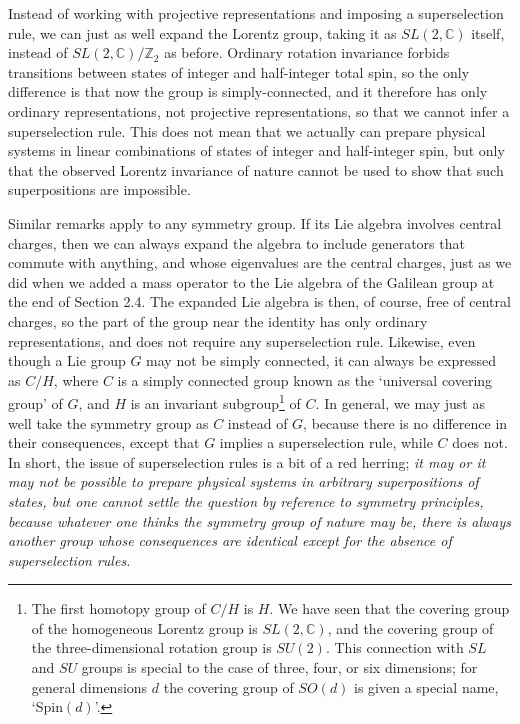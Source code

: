 Instead of working with projective representations and imposing a
superselection rule, we can just as well expand the Lorentz group, taking it as
$SL(2,\mathbb{C})$ itself, instead of $SL(2,\mathbb{C})/\mathbb{Z}_2$ as before. Ordinary rotation
invariance forbids transitions between states of integer and half-integer total
spin, so the only difference is that now the group is simply-connected, and it
therefore has only ordinary representations, not projective representations,
so that we cannot infer a superselection rule. This does not mean that we
actually can prepare physical systems in linear combinations of states of
integer and half-integer spin, but only that the observed Lorentz invariance of
nature cannot be used to show that such superpositions are impossible.

Similar remarks apply to any symmetry group. If its Lie algebra involves
central charges, then we can always expand the algebra to include generators
that commute with anything, and whose eigenvalues are the central charges, just
as we did when we added a mass operator to the Lie algebra of the Galilean group
at the end of Section 2.4. The expanded Lie algebra is then, of course, free of
central charges, so the part of the group near the identity has only ordinary
representations, and does not require any superselection rule. Likewise, even
though a Lie group $G$ may not be simply connected, it can always be expressed
as $C/H$, where $C$ is a simply connected group known as the `universal covering
group' of $G$, and $H$ is an invariant subgroup\footnote{The first homotopy
group of $C/H$ is $H$. We have seen that the covering group of the homogeneous
Lorentz group is $SL(2,\mathbb{C})$, and the covering group of the three-dimensional
rotation group is $SU(2)$. This connection with $SL$ and $SU$ groups is special
to the case of three, four, or six dimensions; for general dimensions $d$ the
covering group of $SO(d)$ is given a special name, `Spin$(d)$'.}
of $C$. In general, we may just as well take the symmetry group as $C$ instead
of $G$, because there is no difference in their consequences, except that $G$
implies a superselection rule, while $C$ does not. In short, the issue of
superselection rules is a bit of a red herring; \emph{it may or it may not be
possible to prepare physical systems in arbitrary superpositions of states,
but one cannot settle the question by reference to symmetry principles,
because whatever one thinks the symmetry group of nature may be, there is
always another group whose consequences are identical except for the absence
of superselection rules.}
